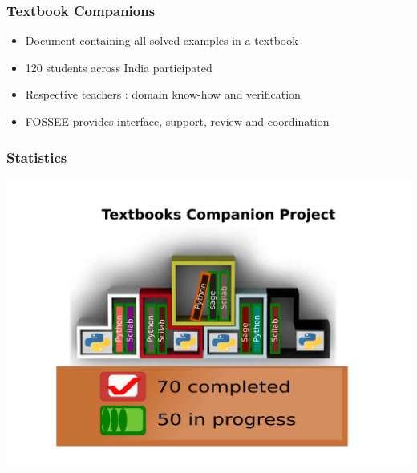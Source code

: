 \documentclass[compress,red]{beamer} %
\begin{document}
\begin{frame}
\frametitle{Textbook Companions}
\begin{itemize}
\item Document containing all solved examples in a textbook \pause 
\item 120 students across India participated \pause
\item Respective teachers : domain know-how and verification \pause
\item FOSSEE provides interface, support, review and coordination
\end{itemize}
\end{frame}

\begin{frame}
\frametitle{Statistics}
\begin{center}
\includegraphics[scale=.15]{textbook.png}
\end{center}
\end{frame}
\end{document}
